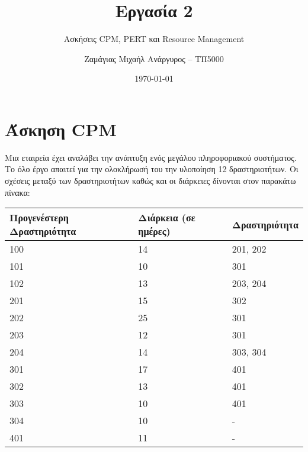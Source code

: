 \documentclass[12pt]{turabian-researchpaper}
\title{Εργασία 2}
\subtitle{Ασκήσεις CPM, PERT και Resource Management}
\author{Ζαμάγιας Μιχαήλ Ανάργυρος -- ΤΠ5000}
\date{\today}
\begin{document}
\begin{titlepage}
    \maketitle
\end{titlepage}

\tableofcontents

\section{Άσκηση CPM}
Μια εταιρεία έχει αναλάβει την ανάπτυξη ενός μεγάλου πληροφοριακού συστήματος. Το όλο έργο απαιτεί για την ολοκλήρωσή του την υλοποίηση 12 δραστηριοτήτων. Οι σχέσεις μεταξύ των δραστηριοτήτων καθώς και οι διάρκειες δίνονται στον παρακάτω πίνακα:
\begin{table}
    \centering
    \begin{tabular}{lll}
        \hline
        Προγενέστερη Δραστηριότητα & Διάρκεια (σε ημέρες) & Δραστηριότητα \\ \hline
        100                        & 14                   & 201, 202      \\
        101                        & 10                   & 301           \\
        102                        & 13                   & 203, 204      \\
        201                        & 15                   & 302           \\
        202                        & 25                   & 301           \\
        203                        & 12                   & 301           \\
        204                        & 14                   & 303, 304      \\
        301                        & 17                   & 401           \\
        302                        & 13                   & 401           \\
        303                        & 10                   & 401           \\
        304                        & 10                   & -             \\
        401                        & 11                   & -             \\ \hline
    \end{tabular}
\end{table}
\end{document}
